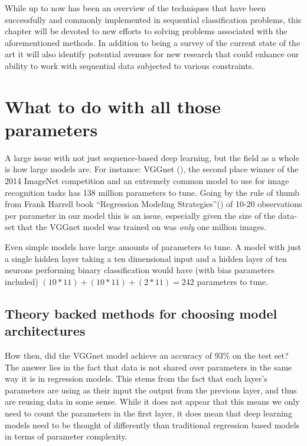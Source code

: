 \documentclass[]{book}
\theoremstyle{definition}
\theoremstyle{definition}
\theoremstyle{definition}
\theoremstyle{remark}
\begin{document}
While up to now has been an overview of the techniques that have been
successfully and commonly implemented in sequential classification
problems, this chapter will be devoted to new efforts to solving
problems associated with the aforementioned methods. In addition to
being a survey of the current state of the art it will also identify
potential avenues for new research that could enhance our ability to
work with sequential data subjected to various constraints.

\section{What to do with all those
parameters}\label{what-to-do-with-all-those-parameters}

A large issue with not just sequence-based deep learning, but the field
as a whole is how large models are. For instance: VGGnet
(\citet{vggnet}), the second place winner of the 2014 ImageNet
competition and an extremely common model to use for image recognition
tasks has 138 million parameters to tune. Going by the rule of thumb
from Frank Harrell book ``Regression Modeling Strategies''(\citet{rms})
of 10-20 observations per parameter in our model this is an issue,
especially given the size of the data-set that the VGGnet model was
trained on was \emph{only} one million images.

Even simple models have large amounts of parameters to tune. A model
with just a single hidden layer taking a ten dimensional input and a
hidden layer of ten neurons performing binary classification would have
(with bias parameters included) \((10*11) + (10*11) + (2*11) = 242\)
parameters to tune.

\subsection{Theory backed methods for choosing model
architectures}\label{theory-backed-methods-for-choosing-model-architectures}

How then, did the VGGnet model achieve an accuracy of 93\% on the test
set? The answer lies in the fact that data is not shared over parameters
in the same way it is in regression models. This stems from the fact
that each layer's parameters are using as their input the output from
the previous layer, and thus are reusing data in some sense. While it
does not appear that this means we only need to count the parameters in
the first layer, it does mean that deep learning models need to be
thought of differently than traditional regression based models in terms
of parameter complexity.
\end{document}
